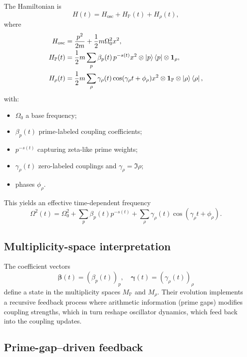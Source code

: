 \documentclass[11pt]{article}
\begin{document}
The Hamiltonian is
\[
H(t) = H_{\text{osc}} + H_{\mathbb{P}}(t) + H_{\rho}(t),
\]
where
\begin{align*}
H_{\text{osc}} &= \frac{p^2}{2m} + \frac{1}{2} m \Omega_0^2 x^2, \\
H_{\mathbb{P}}(t) &= \frac{1}{2} m \sum_{p} \beta_p(t)\, p^{-s(t)} x^2 \otimes \ket{p}\bra{p} \otimes \mathbf{1}_{\rho}, \\
H_{\rho}(t) &= \frac{1}{2} m \sum_{\rho} \gamma_{\rho}(t) \cos(\gamma_{\rho} t + \phi_{\rho}) x^2 \otimes \mathbf{1}_{\mathbb{P}} \otimes \ket{\rho}\bra{\rho},
\end{align*}
with:
\begin{itemize}[nosep]
    \item $\Omega_0$ a base frequency;
    \item $\beta_p(t)$ prime-labeled coupling coefficients;
    \item $p^{-s(t)}$ capturing zeta-like prime weights;
    \item $\gamma_{\rho}(t)$ zero-labeled couplings and $\gamma_{\rho} = \Im \rho$;
    \item phases $\phi_{\rho}$.
\end{itemize}
This yields an effective time-dependent frequency
\[
\Omega^2(t) = \Omega_0^2 + \sum_{p} \beta_p(t) p^{-s(t)} + \sum_{\rho} \gamma_{\rho}(t) \cos(\gamma_{\rho} t + \phi_{\rho}).
\]

\subsection{Multiplicity-space interpretation}

The coefficient vectors
\[
\bm{\beta}(t) = (\beta_p(t))_{p}, \quad \bm{\gamma}(t) = (\gamma_{\rho}(t))_{\rho}
\]
define a state in the multiplicity spaces $M_{\mathbb{P}}$ and $M_{\rho}$. Their evolution implements a recursive feedback process where arithmetic information (prime gaps) modifies coupling strengths, which in turn reshape oscillator dynamics, which feed back into the coupling updates.

\subsection{Prime-gap–driven feedback}
\end{document}
